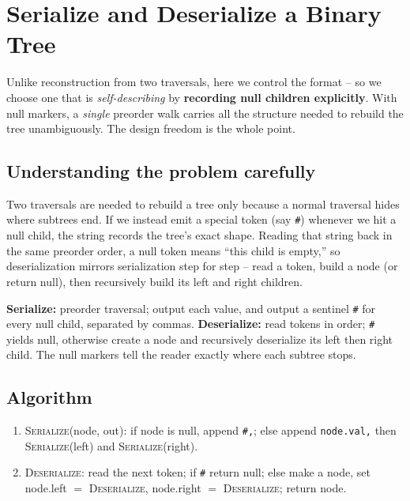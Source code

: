 \section{Serialize and Deserialize a Binary Tree}
\label{sec:trees-serialize}


\begin{patternbox}
Unlike reconstruction from two traversals, here we control the format --
so we choose one that is \emph{self-describing} by \textbf{recording null
children explicitly}. With null markers, a \emph{single} preorder walk
carries all the structure needed to rebuild the tree unambiguously. The
design freedom is the whole point.
\end{patternbox}

\subsection*{Understanding the problem carefully}

Two traversals are needed to rebuild a tree only because a normal traversal
hides where subtrees end. If we instead emit a special token (say \verb|#|)
whenever we hit a null child, the string records the tree's exact shape.
Reading that string back in the same preorder order, a null token means
``this child is empty,'' so deserialization mirrors serialization step for
step -- read a token, build a node (or return null), then recursively build
its left and right children.

\begin{ideabox}
\textbf{Serialize:} preorder traversal; output each value, and output a
sentinel \verb|#| for every null child, separated by commas.
\textbf{Deserialize:} read tokens in order; \verb|#| yields null,
otherwise create a node and recursively deserialize its left then right
child. The null markers tell the reader exactly where each subtree stops.
\end{ideabox}

\subsection*{Algorithm}

\begin{enumerate}
  \item \textsc{Serialize}(node, out): if node is null, append
        \verb|#,|; else append \verb|node.val,| then
        \textsc{Serialize}(left) and \textsc{Serialize}(right).
  \item \textsc{Deserialize}: read the next token; if \verb|#| return
        null; else make a node, set node.left $=$ \textsc{Deserialize},
        node.right $=$ \textsc{Deserialize}; return node.
\end{enumerate}

